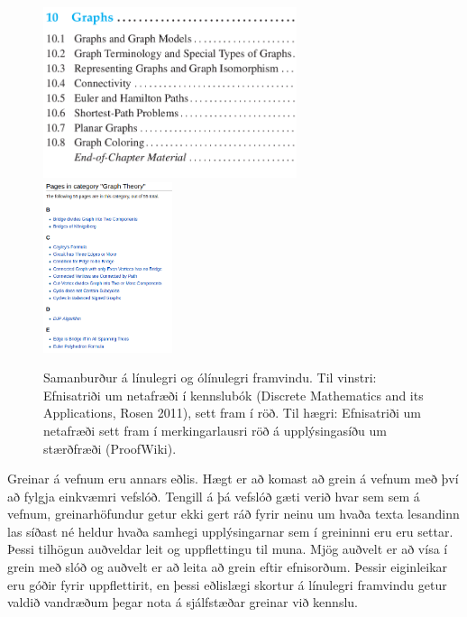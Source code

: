 \documentclass[a4paper,12pt,twoside,BCOR=10mm]{scrbook}
\begin{document}
\begin{figure}
\caption[Samanburður á línulegri og ólínulegri framvindu]{Samanburður á línulegri og ólínulegri framvindu. Til vinstri: Efnisatriði um netafræði í kennslubók (Discrete Mathematics and its Applications, Rosen 2011), sett fram í röð. Til hægri: Efnisatriði um netafræði sett fram í merkingarlausri röð á upplýsingasíðu um stærðfræði (ProofWiki\footnotemark).}
\begin{center}
\includegraphics[height=5cm]{ordered-progression}
\hspace{1cm}
\includegraphics[height=5cm]{unordered-progression}
\end{center}
\end{figure}

Greinar á vefnum eru annars eðlis. Hægt er að komast að grein á vefnum með því að fylgja einkvæmri vefslóð. Tengill á þá vefslóð gæti verið hvar sem sem á vefnum, greinarhöfundur getur ekki gert ráð fyrir neinu um hvaða texta lesandinn las síðast né heldur hvaða samhegi upplýsingarnar sem í greininni eru eru settar. Þessi tilhögun auðveldar leit og uppflettingu til muna. Mjög auðvelt er að vísa í grein með slóð og auðvelt er að leita að grein eftir efnisorðum. Þessir eiginleikar eru góðir fyrir uppflettirit, en þessi eðlislægi skortur á línulegri framvindu getur valdið vandræðum þegar nota á sjálfstæðar greinar við kennslu.
 
\end{document}
